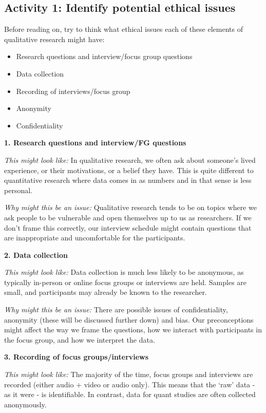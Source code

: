 \documentclass[
  english,
  letterpaper,
  DIV=11,
  numbers=noendperiod]{scrreprt}
\providecommand{\tightlist}{%
  \setlength{\itemsep}{0pt}\setlength{\parskip}{0pt}}
\begin{document}
\subsection{Activity 1: Identify potential ethical
issues}\label{activity-1-identify-potential-ethical-issues}

Before reading on, try to think what ethical issues each of these
elements of qualitative research might have:

\begin{itemize}
\tightlist
\item
  Research questions and interview/focus group questions
\item
  Data collection
\item
  Recording of interviews/focus group
\item
  Anonymity
\item
  Confidentiality
\end{itemize}

\textbf{1. Research questions and interview/FG questions}

\emph{This might look like:} In qualitative research, we often ask about
someone's lived experience, or their motivations, or a belief they have.
This is quite different to quantitative research where data comes in as
numbers and in that sense is less personal.

\emph{Why might this be an issue:} Qualitative research tends to be on
topics where we ask people to be vulnerable and open themselves up to us
as researchers. If we don't frame this correctly, our interview schedule
might contain questions that are inappropriate and uncomfortable for the
participants.

\textbf{2. Data collection}

\emph{This might look like:} Data collection is much less likely to be
anonymous, as typically in-person or online focus groups or interviews
are held. Samples are small, and participants may already be known to
the researcher.

\emph{Why might this be an issue:} There are possible issues of
confidentiality, anonymity (these will be discussed further down) and
bias. Our preconceptions might affect the way we frame the questions,
how we interact with participants in the focus group, and how we
interpret the data.

\textbf{3. Recording of focus groups/interviews}

\emph{This might look like:} The majority of the time, focus groups and
interviews are recorded (either audio + video or audio only). This means
that the `raw' data - as it were - is identifiable. In contrast, data
for quant studies are often collected anonymously.
\end{document}
